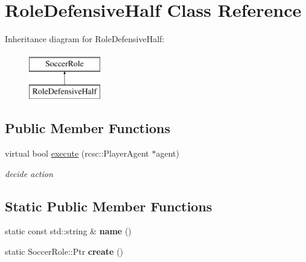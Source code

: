 \hypertarget{classRoleDefensiveHalf}{
\section{RoleDefensiveHalf Class Reference}
\label{classRoleDefensiveHalf}
}
Inheritance diagram for RoleDefensiveHalf:\begin{figure}[H]
\begin{center}
\leavevmode
\includegraphics[height=2.000000cm]{classRoleDefensiveHalf}
\end{center}
\end{figure}
\subsection*{Public Member Functions}
\begin{DoxyCompactItemize}
\item 
\hypertarget{classRoleDefensiveHalf_abaa738388173ca49ec7ce80880f1f48d}{
virtual bool \hyperlink{classRoleDefensiveHalf_abaa738388173ca49ec7ce80880f1f48d}{execute} (rcsc::PlayerAgent $\ast$agent)}
\label{classRoleDefensiveHalf_abaa738388173ca49ec7ce80880f1f48d}

\begin{DoxyCompactList}\small\item\em decide action \item\end{DoxyCompactList}\end{DoxyCompactItemize}
\subsection*{Static Public Member Functions}
\begin{DoxyCompactItemize}
\item 
\hypertarget{classRoleDefensiveHalf_aa364bc74ed752396967811dfdc25827d}{
static const std::string \& {\bfseries name} ()}
\label{classRoleDefensiveHalf_aa364bc74ed752396967811dfdc25827d}

\item 
\hypertarget{classRoleDefensiveHalf_a95a4bae450edbc0b0931151a943b21fe}{
static SoccerRole::Ptr {\bfseries create} ()}
\label{classRoleDefensiveHalf_a95a4bae450edbc0b0931151a943b21fe}

\end{DoxyCompactItemize}
